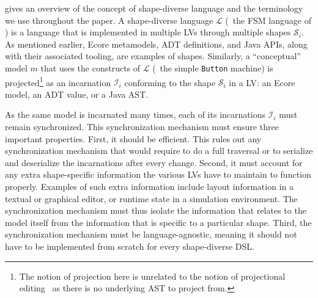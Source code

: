  gives an overview of the concept of shape-diverse language and the terminology we use throughout the paper.
A shape-diverse language $\mathcal{L}$ (\eg~the FSM language of ) is a language that is implemented in multiple LVs through multiple shapes $\mathcal{S}_i$.
As mentioned earlier, Ecore metamodels, ADT definitions, and Java APIs, along with their associated tooling, are examples of shapes.
Similarly, a ``conceptual'' model $m$ that uses the constructs of $\mathcal{L}$ (\eg~the simple {\footnotesize \texttt{Button}} machine) is projected\footnote{The notion of projection here is unrelated to the notion of projectional editing~\cite{voelter2015projecting} as there is no underlying AST to project from.} as an incarnation $\mathcal{I}_i$ conforming to the shape $\mathcal{S}_i$ in a LV: an Ecore model, an ADT value, or a Java AST.


As the same model is incarnated many times, each of its incarnations $\mathcal{I}_i$ must remain synchronized.
This synchronization mechanism must ensure three important properties.
First, it should be efficient.
This rules out any synchronization mechanism that would require to do a full traversal or to serialize and deserialize the incarnations after every change.
Second, it must account for any extra shape-specific information the various LVs have to maintain to function properly.
Examples of such extra information include layout information in a textual or graphical editor, or runtime state in a simulation environment.
The synchronization mechanism must thus isolate the information that relates to the model itself from the information that is specific to a particular shape.
Third, the synchronization mechanism must be language-agnostic, meaning it should not have to be implemented from scratch for every shape-diverse DSL.
